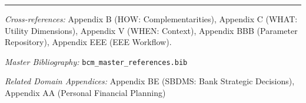 
\vspace{1em}
\hrule
\vspace{0.5em}

\noindent\textit{Cross-references:}
Appendix B (HOW: Complementarities),
Appendix C (WHAT: Utility Dimensions),
Appendix V (WHEN: Context),
Appendix BBB (Parameter Repository),
Appendix EEE (EEE Workflow).

\noindent\textit{Master Bibliography:} \texttt{bcm\_master\_references.bib}

\noindent\textit{Related Domain Appendices:} Appendix BE (SBDMS: Bank Strategic Decisions), Appendix AA (Personal Financial Planning)

